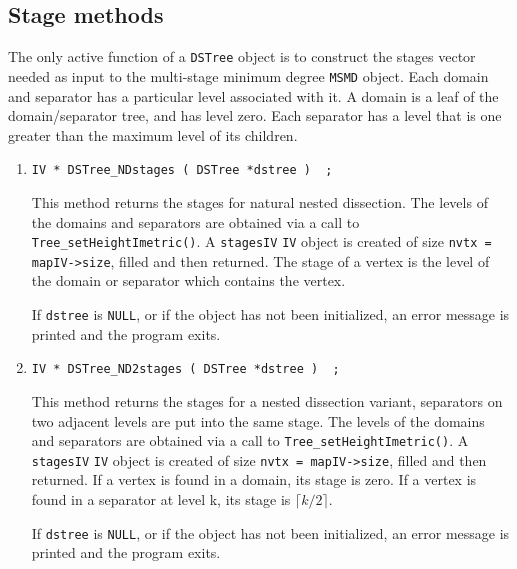 \subsection{Stage methods}
\label{subsection:DSTree:proto:stages}
\par
The only active function of a {\tt DSTree} object is to construct
the stages vector needed as input to the multi-stage
minimum degree {\tt MSMD} object.
Each domain and separator has a particular level associated with it.
A domain is a leaf of the domain/separator tree, and has level zero.
Each separator has a level that is one greater than the maximum
level of its children.
\par
\begin{enumerate}
\item
\begin{verbatim}
IV * DSTree_NDstages ( DSTree *dstree )  ;
\end{verbatim}
This method returns the stages for natural nested dissection.
The levels of the domains and separators are obtained via a call to
{\tt Tree\_setHeightImetric()}.
A {\tt stagesIV} {\tt IV} object is created of size 
{\tt nvtx = mapIV->size}, filled and then returned.
The stage of a vertex is the level of the domain or separator which
contains the vertex.
\par {}
If {\tt dstree} is {\tt NULL},
or if the object has not been initialized,
an error message is printed and the program exits.
\item
\begin{verbatim}
IV * DSTree_ND2stages ( DSTree *dstree )  ;
\end{verbatim}
This method returns the stages for a nested dissection variant,
separators on two adjacent levels are put into the same stage.
The levels of the domains and separators are obtained via a call to
{\tt Tree\_setHeightImetric()}.
A {\tt stagesIV} {\tt IV} object is created of size 
{\tt nvtx = mapIV->size}, filled 
and then returned.
If a vertex is found in a domain, its stage is zero.
If a vertex is found in a separator at level k, its stage is
$\lceil k/2 \rceil$.
\par {}
If {\tt dstree} is {\tt NULL},
or if the object has not been initialized,
an error message is printed and the program exits.

\end{enumerate}
